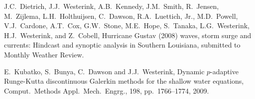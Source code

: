 \begin{thebibliography}{10}
 J.C.~Dietrich, J.J.~Westerink, A.B.~Kennedy, J.M.~Smith,
R.~Jensen, M.~Zijlema, L.H.~Holthuijsen, C.~Dawson, R.A.~Luettich, Jr., M.D.~Powell, V.J.~Cardone, A.T.~Cox, G.W.~Stone, M.E.~Hope, S.~Tanaka, L.G.~Westerink,
H.J.~Westerink, and Z.~Cobell, Hurricane Gustav (2008) waves, storm surge and currents:  Hindcast and synoptic analysis in Southern Louisiana, submitted to Monthly Weather Review.

 E.~Kubatko, S.~Bunya, C.~Dawson and J.J.~Westerink, Dynamic $p$-adaptive Runge-Kutta discontinuous Galerkin methods for the shallow water equations, Comput.~Methods Appl.~Mech.~Engrg., 198, pp.\ 1766--1774, 2009.

\end{thebibliography}

